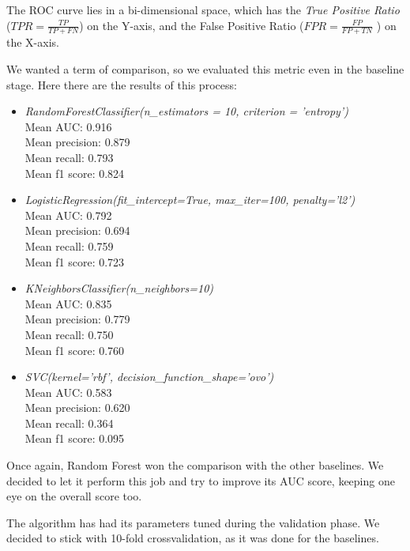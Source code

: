 The ROC curve lies in a bi-dimensional space, which has the \textit{True Positive Ratio} ($ TPR =  \frac{TP}{TP+FN}$) on the Y-axis, and the False Positive Ratio ($ FPR =  \frac{FP}{FP+TN}$ ) on the X-axis.

We wanted a term of comparison, so we evaluated this metric even in the baseline stage. Here there are the results of this process:
\begin{itemize}
	\item[\PencilRight] \textit{RandomForestClassifier(n\_estimators = 10, criterion = 'entropy')}\\
	Mean AUC: 0.916\\
	Mean precision: 0.879\\
	Mean recall: 0.793\\
	Mean f1 score: 0.824
	\item[\PencilRight]\textit{LogisticRegression(fit\_intercept=True, max\_iter=100, penalty='l2')}\\
	Mean AUC: 0.792\\
	Mean precision: 0.694\\
	Mean recall: 0.759\\
	Mean f1 score: 0.723
	\item[\PencilRight]\textit{KNeighborsClassifier(n\_neighbors=10)}\\
	Mean AUC: 0.835\\
	Mean precision: 0.779\\
	Mean recall: 0.750\\
	Mean f1 score: 0.760
	\item[\PencilRight]\textit{SVC(kernel='rbf', decision\_function\_shape='ovo')}\\
	Mean AUC: 0.583\\
	Mean precision: 0.620\\
	Mean recall: 0.364\\
	Mean f1 score: 0.095
\end{itemize}
Once again, Random Forest won the comparison with the other baselines.
We decided to let it perform this job and try to improve its AUC score, keeping one eye on the overall score too.

The algorithm has had its parameters tuned during the validation phase.
We decided to stick with 10-fold crossvalidation, as it was done for the baselines.


